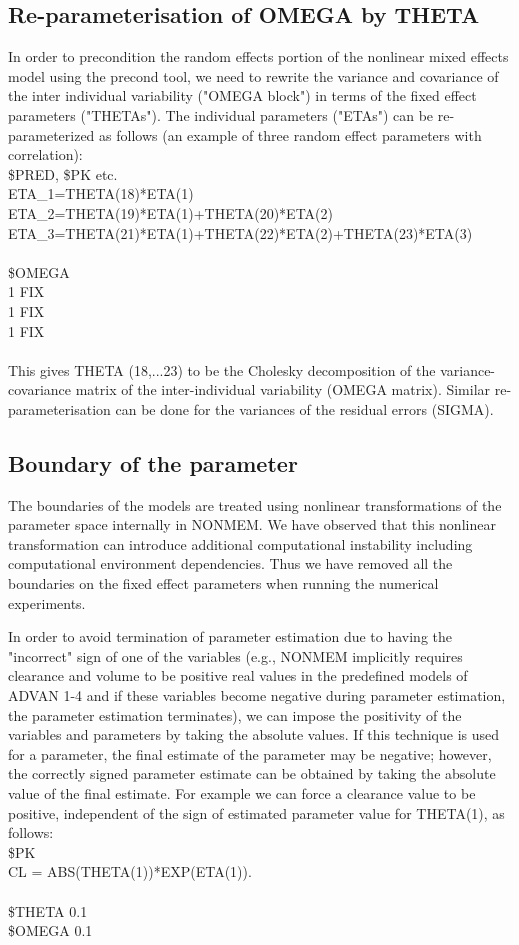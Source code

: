 \subsection{Re-parameterisation of OMEGA by THETA} \label{app::repara}
In order to precondition the random effects portion of the nonlinear mixed effects model using the precond tool, we need to rewrite the variance and covariance of the inter individual variability ("OMEGA block") in terms of the fixed effect parameters ("THETAs"). The individual parameters ("ETAs") can be re-parameterized as follows (an example of three random effect parameters with correlation):\\
\$PRED, \$PK etc.\\
ETA\_1=THETA(18)*ETA(1)\\
ETA\_2=THETA(19)*ETA(1)+THETA(20)*ETA(2)\\
ETA\_3=THETA(21)*ETA(1)+THETA(22)*ETA(2)+THETA(23)*ETA(3)\\
\\
\$OMEGA\\  1  FIX\\
 1  FIX\\
 1  FIX\\
 \\
This gives THETA (18,...23) to be the Cholesky decomposition of the variance-covariance matrix of the inter-individual variability (OMEGA matrix). Similar re-parameterisation can be done for the variances of the residual errors (SIGMA).

\subsection{Boundary of the parameter} \label{app::abs}
The boundaries of the models are treated using nonlinear transformations of the parameter space internally in NONMEM.  We have observed that this nonlinear transformation can introduce additional computational instability including computational environment dependencies. Thus we have removed all the boundaries on the fixed effect parameters when running the numerical experiments.

In order to avoid  termination of  parameter estimation due to having the "incorrect" sign of one of the variables (e.g., NONMEM implicitly requires clearance and volume to be positive real values in the predefined models of ADVAN 1-4 and if these variables become negative during  parameter estimation, the parameter estimation terminates), we can impose the positivity of the variables and parameters by taking the absolute values. If this technique is used for a parameter, the final estimate of the parameter may be negative; however, the correctly signed parameter estimate can be obtained by taking the absolute value of the final estimate.  For example we can force a clearance value to be positive, independent of the sign of estimated parameter value for THETA(1), as follows:\\
\$PK\\
CL     = ABS(THETA(1))*EXP(ETA(1)).\\
\\
\$THETA 0.1\\
\$OMEGA 0.1\\

